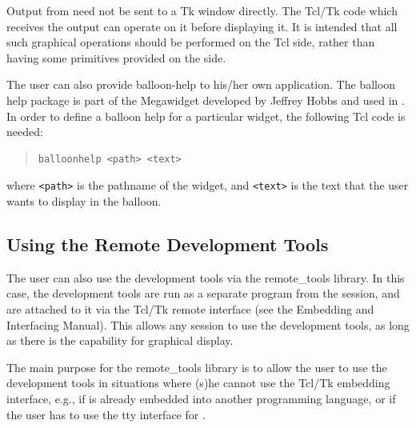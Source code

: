 Output from {\eclipse} need not be sent to a Tk window directly. The Tcl/Tk
code which receives the output can operate on it before displaying it. It
is intended that all such graphical operations should be performed on the
Tcl side, rather than having some primitives provided on the {\eclipse} side.


The user can also provide balloon-help to his/her own application. The
balloon help package is part of the Megawidget developed by Jeffrey Hobbs
and used in {\tkeclipse}. In order to define a balloon help for a particular
widget, the following Tcl code is needed:

\begin{quote}
\begin{verbatim}
balloonhelp <path> <text>
\end{verbatim}
\end{quote}

\noindent
where \verb'<path>' is the pathname of the widget, and \verb'<text>' is the
text that the user wants to display in the balloon.


\subsection{Using the Remote Development Tools}
\label{useremotetools}

The user can also use the development tools via the remote_tools
library. In this case, the development tools are run as a separate program
from the {\eclipse} session, and are attached to it via the Tcl/Tk remote
interface (see the Embedding and Interfacing Manual). This allows any
{\eclipse} session to use the development tools,
as long as there is the capability for graphical display.

The main purpose for the remote_tools library is to allow the user to
use the development tools in situations where (s)he cannot use the Tcl/Tk
embedding interface, e.g., if {\eclipse} is already embedded into another
programming language, or if the user has to use the tty interface for
{\eclipse}.

